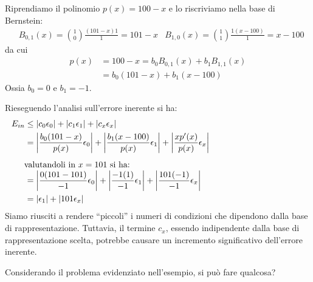 \documentclass{article}
\begin{document}
\begin{example}
   Riprendiamo il polinomio $p(x)=100-x$ e lo riscriviamo nella base di
   Bernstein:
   \begin{equation*}
       \begin{aligned}
           & B_{0,1}(x)=\binom{1}{0}\frac{(101-x)1}{1}=101-x &
           B_{1,0}(x)=\binom{1}{1}\frac{1(x-100)}{1}=x-100
       \end{aligned}
   \end{equation*}
   da cui 
   \begin{equation*}
       \begin{aligned}
           p(x)&=100-x=b_0B_{0,1}(x)+b_1B_{1,1}(x)\\
               &=b_0(101-x)+b_1(x-100)
       \end{aligned}
   \end{equation*}
   Ossia $b_0=0$ e $b_1=-1$.
   
   Rieseguendo l'analisi sull'errore inerente si ha:
   \begin{equation*}
       \begin{aligned}
           E_{in}&\leq \left\lvert c_0\epsilon_0 \right\rvert 
            + \left\lvert c_1\epsilon_1\right\rvert 
            + \left\lvert c_x\epsilon_x\right\rvert\\
                 &= \left\lvert \frac{b_0(101-x)}{p(x)}\epsilon_0\right\rvert
                 + \left\lvert \frac{b_1(x-100)}{p(x)}\epsilon_1\right\rvert
             + \left\lvert \frac{xp'(x)}{p(x)}\epsilon_x\right\rvert \\
             \alignedintertext{valutandoli in $x=101$ si ha:}
                 &=\left\lvert \frac{0(101-101)}{-1}\epsilon_0\right\rvert + 
                 \left\lvert \frac{-1(1)}{-1}\epsilon_1\right\rvert +
                 \left\lvert \frac{101(-1)}{-1}\epsilon_x\right\rvert \\ 
                 &= \left\lvert \epsilon_1 \right\rvert + \left\lvert
                 101\epsilon_x\right\rvert
       \end{aligned}
   \end{equation*}
   Siamo riusciti a rendere ``piccoli'' i numeri di condizioni che dipendono
   dalla base di rappresentazione. Tuttavia, il termine $c_x$, essendo
   indipendente dalla base di rappresentazione scelta, potrebbe causare un
   incremento significativo dell'errore inerente.
\end{example}
Considerando il problema evidenziato nell'esempio, si può fare qualcosa?
\end{document}
